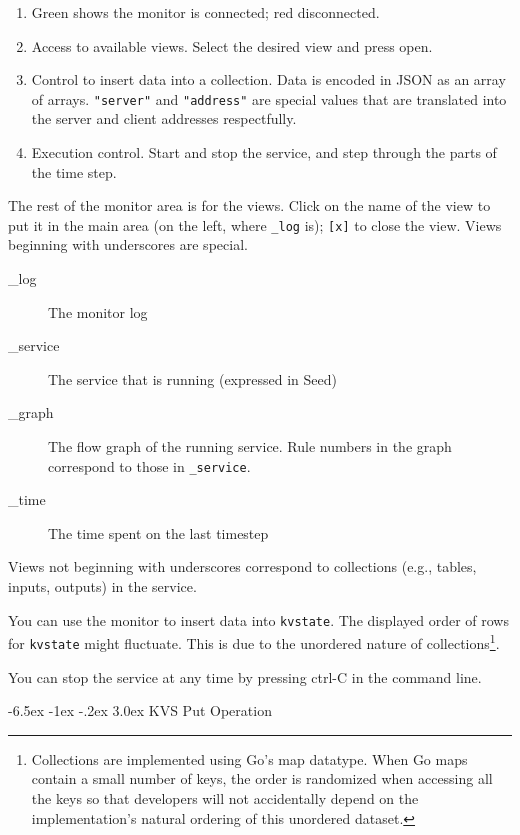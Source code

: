 \documentclass[a5paper,12pt,onecolumn]{article}
\makeatletter
\def\code#1{\mbox{\lstinline{#1}}}
\renewcommand\section{\@startsection {section}{1}{\z@}%
	{-6.5ex \@plus -1ex \@minus -.2ex}%
	{3.0ex}%
	{\sf\Large}}
\makeatother
\begin{document}
\begin{enumerate}
\item Green shows the monitor is connected; red disconnected.
\item Access to available views. Select the desired view and press open.
\item Control to insert data into a collection. Data is encoded in JSON as an array of arrays. \code{"server"} and \code{"address"} are special values that are translated into the server and client addresses respectfully.
\item Execution control. Start and stop the service, and step through the parts of the time step.
\end{enumerate}

The rest of the monitor area is for the views. Click on the name of the view to put it in the main area (on the left, where \code{_log} is); \code{[x]} to close the view. Views beginning with underscores are special.

\begin{description}
\item[\_log] The monitor log
\item[\_service] The service that is running (expressed in Seed)
\item[\_graph] The flow graph of the running service. Rule numbers in the graph correspond to those in \code{_service}.
\item[\_time] The time spent on the last timestep
\end{description}

Views not beginning with underscores correspond to collections (e.g., tables, inputs, outputs) in the service.

You can use the monitor to insert data into \code{kvstate}. The displayed order of rows for \code{kvstate} might fluctuate. This is due to the unordered nature of collections\footnote{Collections are implemented using Go's map datatype. When Go maps contain a small number of keys, the order is randomized when accessing all the keys so that developers will not accidentally depend on the implementation's natural ordering of this unordered dataset.}.

You can stop the service at any time by pressing ctrl-C in the command line.

\section{KVS Put Operation}
\end{document}
